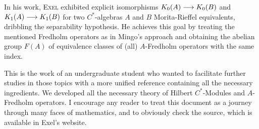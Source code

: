 In his work, \textsc{Exel} exhibited explicit isomorphisms $K_0(A)\longrightarrow K_0(B)$ and $K_1(A)\longrightarrow K_1(B)$ for two $C^*$-algebras $A$ and $B$ Morita-Rieffel equivalents, dribbling the separability hypothesis. He achieves this goal by treating the mentioned Fredholm operators as in Mingo's approach \cite{mingo1987K} and obtaining the abelian group $F(A)$ of equivalence classes of (all) $A$-Fredholm operators with the same index. 

This is the work of an undergraduate student who wanted to facilitate further studies in those topics with a more unified reference containing all the necessary ingredients. We developed all the necessary theory of Hilbert $C^*$-Modules and $A$-Fredholm operators. I encourage any reader to treat this document as a journey through many faces of mathematics, and to obviously check the source, which is available in Exel's website. 

